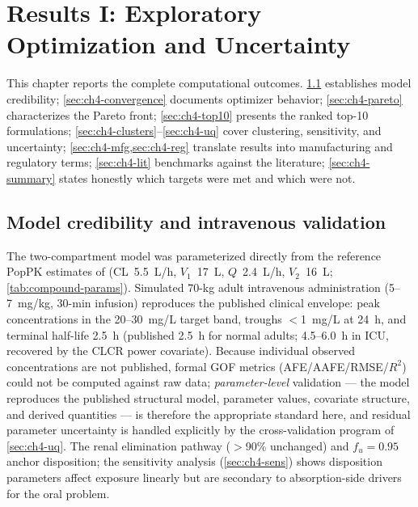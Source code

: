 \chapter{Results I: Exploratory Optimization and Uncertainty}
\label{chap:results}

This chapter reports the complete computational outcomes. \cref{sec:ch4-validation} establishes model credibility; \cref{sec:ch4-convergence} documents optimizer behavior; \cref{sec:ch4-pareto} characterizes the Pareto front; \cref{sec:ch4-top10} presents the ranked top-10 formulations; \cref{sec:ch4-clusters}--\ref{sec:ch4-uq} cover clustering, sensitivity, and uncertainty; \cref{sec:ch4-mfg,sec:ch4-reg} translate results into manufacturing and regulatory terms; \cref{sec:ch4-lit} benchmarks against the literature; \cref{sec:ch4-summary} states honestly which targets were met and which were not.

\section{Model credibility and intravenous validation}
\label{sec:ch4-validation}

The two-compartment model was parameterized directly from the reference PopPK estimates of \citet{Li2021} (CL~5.5~L/h, $V_1$~17~L, $Q$~2.4~L/h, $V_2$~16~L; \cref{tab:compound-params}). Simulated 70-kg adult intravenous administration (5--7~mg/kg, 30-min infusion) reproduces the published clinical envelope: peak concentrations in the 20--30~mg/L target band, troughs $<$1~mg/L at 24~h, and terminal half-life 2.5~h (published 2.5~h for normal adults; 4.5--6.0~h in ICU, recovered by the CLCR power covariate). Because individual observed concentrations are not published, formal GOF metrics (AFE/AAFE/RMSE/$R^2$) could not be computed against raw data; \emph{parameter-level} validation --- the model reproduces the published structural model, parameter values, covariate structure, and derived quantities --- is therefore the appropriate standard here, and residual parameter uncertainty is handled explicitly by the cross-validation program of \cref{sec:ch4-uq}. The renal elimination pathway ($>$90\% unchanged) and $f_u = 0.95$ anchor disposition; the sensitivity analysis (\cref{sec:ch4-sens}) shows disposition parameters affect exposure linearly but are secondary to absorption-side drivers for the oral problem.

